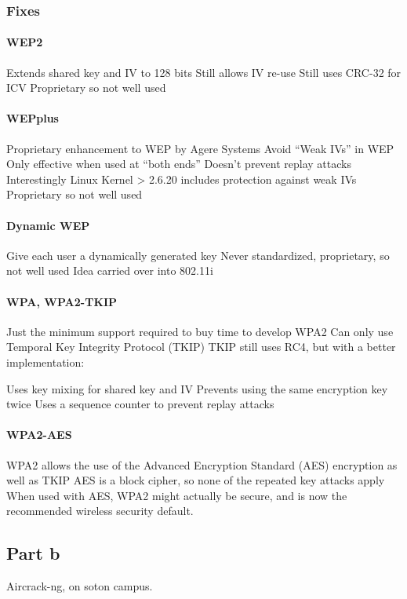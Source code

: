 \documentclass[pdftex, 12pt, a4paper]{article}
\begin{document}
\subsubsection{Fixes}

\paragraph{WEP2}
Extends shared key and IV to 128 bits
Still allows IV re-use
Still uses CRC-32 for ICV
Proprietary so not well used
\paragraph{WEPplus}
Proprietary enhancement to WEP by Agere Systems
Avoid ``Weak IVs'' in WEP
Only effective when used at ``both ends''
Doesn't prevent replay attacks
Interestingly Linux Kernel > 2.6.20 includes protection against weak IVs
Proprietary so not well used
\paragraph{Dynamic WEP}
Give each user a dynamically generated key
Never standardized, proprietary, so not well used
Idea carried over into 802.11i

\paragraph{WPA, WPA2-TKIP}
Just the minimum support required to buy time to develop WPA2
Can only use Temporal Key Integrity Protocol (TKIP)
TKIP still uses RC4, but with a better implementation:

Uses key mixing for shared key and IV
Prevents using the same encryption key twice
Uses a sequence counter to prevent replay attacks

\paragraph{WPA2-AES}
WPA2 allows the use of the Advanced Encryption Standard (AES) encryption as well as TKIP
AES is a block cipher, so none of the repeated key attacks apply
When used with AES, WPA2 might actually be secure, and is now the recommended wireless security default.

\subsection{Part b}
Aircrack-ng, on soton campus.

\pagebreak
\printbibliography
\end{document}

